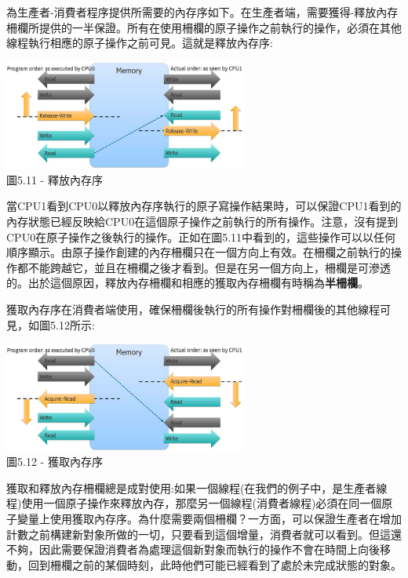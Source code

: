 為生產者-消費者程序提供所需要的內存序如下。在生產者端，需要獲得-釋放內存柵欄所提供的一半保證。所有在使用柵欄的原子操作之前執行的操作，必須在其他線程執行相應的原子操作之前可見。這就是釋放內存序:

\begin{center}
\includegraphics[width=0.6\textwidth]{content/1/chapter5/images/11.jpg}\\
圖5.11 - 釋放內存序
\end{center}

當CPU1看到CPU0以釋放內存序執行的原子寫操作結果時，可以保證CPU1看到的內存狀態已經反映給CPU0在這個原子操作之前執行的所有操作。注意，沒有提到CPU0在原子操作之後執行的操作。正如在圖5.11中看到的，這些操作可以以任何順序顯示。由原子操作創建的內存柵欄只在一個方向上有效。在柵欄之前執行的操作都不能跨越它，並且在柵欄之後才看到。但是在另一個方向上，柵欄是可滲透的。出於這個原因，釋放內存柵欄和相應的獲取內存柵欄有時稱為\textbf{半柵欄}。

獲取內存序在消費者端使用，確保柵欄後執行的所有操作對柵欄後的其他線程可見，如圖5.12所示:

\begin{center}
\includegraphics[width=0.6\textwidth]{content/1/chapter5/images/12.jpg}\\
圖5.12 - 獲取內存序
\end{center}

獲取和釋放內存柵欄總是成對使用:如果一個線程(在我們的例子中，是生產者線程)使用一個原子操作來釋放內存，那麼另一個線程(消費者線程)必須在同一個原子變量上使用獲取內存序。為什麼需要兩個柵欄？一方面，可以保證生產者在增加計數之前構建新對象所做的一切，只要看到這個增量，消費者就可以看到。但這還不夠，因此需要保證消費者為處理這個新對象而執行的操作不會在時間上向後移動，回到柵欄之前的某個時刻，此時他們可能已經看到了處於未完成狀態的對象。

